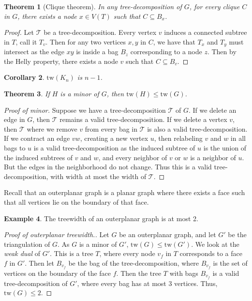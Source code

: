 \documentclass[]{report}
\newcommand{\tree}{\mathcal{T}}
\newcommand{\tw}{\text{tw}}
\newtheorem{theorem}{Theorem}
\newtheorem{corollary}[theorem]{Corollary}
\theoremstyle{definition}
\newtheorem{example}[theorem]{Example}
\numberwithin{theorem}{section}
\numberwithin{equation}{section}
\begin{document}
\begin{theorem}[Clique theorem]\label{thm:clique}
	In any tree-decomposition of $G$, for every clique $C$ in $G$, there exists a node $x \in V(T)$ such that $C \subseteq B_x$. 
\end{theorem}

\begin{proof}
	Let $\tree$ be a tree-decomposition. Every vertex $v$ induces a connected subtree in $T$, call it $T_v$. Then for any two vertices $x, y$ in $C$, we have that $T_x$ and $T_y$ must intersect as the edge $xy$ is inside a bag $B_z$ corresponding to a node $z$. Then by the Helly property, there exists a node $v$ such that $C \subseteq B_v$.
\end{proof}

\begin{corollary}\label{cor:complete_tw}
	$\tw(K_n)$ is $n-1$. 
\end{corollary}

\begin{theorem}\label{thm:tw_minor_closure}
	If $H$ is a minor of $G$, then $\tw(H) \leq \tw(G)$. 
\end{theorem}
\begin{proof}[Proof of minor]
	Suppose we have a tree-decomposition $\tree$ of $G$. If we delete an edge in $G$, then $\tree$ remains a valid tree-decomposition. If we delete a vertex $v$, then $\tree$ where we remove $v$ from every bag in $\tree$ is also a valid tree-decomposition. If we contract an edge $vw$, creating a new vertex $u$, then relabeling $v$ and $w$ in all bags to $u$ is a valid tree-decomposition as the induced subtree of $u$ is the union of the induced subtrees of $v$ and $w$, and every neighbor of $v$ or $w$ is a neighbor of $u$. But the edges in the neighborhood do not change. Thus this is a valid tree-decomposition, with width at most the width of $\tree$.
\end{proof}

Recall that an outerplanar graph is a planar graph where there exists a face such that all vertices lie on the boundary of that face. 
\begin{example}\label{ex:tw_outerplanar}
	The treewidth of an outerplanar graph is at most 2.
\end{example}
\begin{proof}[Proof of outerplanar treewidth.]
	Let $G$ be an outerplanar graph, and let $G'$ be the triangulation of $G$. As $G$ is a minor of $G'$, $\tw(G) \leq \tw(G')$. We look at the \textit{weak dual} of $G'$. This is a tree $T$, where every node $v_f$ in $T$ corresponds to a face $f$ in $G'$. Then let $B_{v_f}$ be the bag of the tree-decomposition, where $B_{v_f}$ is the set of vertices on the boundary of the face $f$. Then the tree $T$ with bags $B_{v_f}$ is a valid tree-decomposition of $G'$, where every bag has at most 3 vertices. Thus, $\tw(G) \leq 2$. 
\end{proof}
\end{document}
